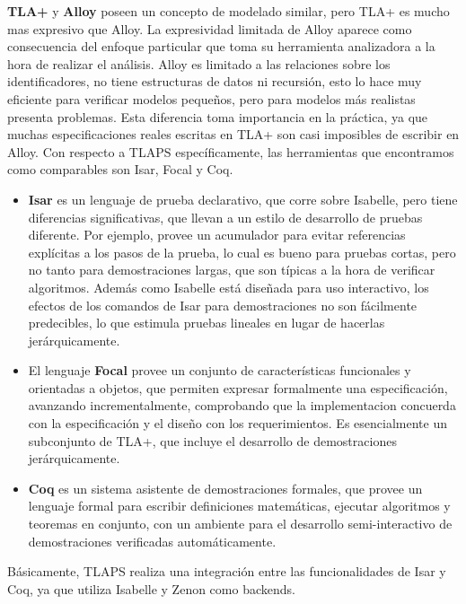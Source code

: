 \documentclass[spanish]{llncs}
\begin{document}
\textbf{TLA+} y \textbf{Alloy} poseen un concepto de modelado similar, pero TLA+ es mucho mas expresivo que Alloy. La expresividad limitada de Alloy aparece como consecuencia del enfoque particular que toma su herramienta analizadora a la hora de realizar el análisis. Alloy es limitado a las relaciones sobre los identificadores, no tiene estructuras de datos ni recursión, esto lo hace muy eficiente para verificar modelos pequeños, pero para modelos más realistas presenta problemas. 
Esta diferencia toma importancia en la práctica, ya que muchas especificaciones reales escritas en TLA+ son 
casi imposibles de escribir en Alloy.
Con respecto a TLAPS específicamente, las herramientas que encontramos como comparables son Isar, Focal y Coq.
    \begin{itemize}
      \item 
      \textbf{Isar} es un lenguaje de prueba declarativo, que corre sobre Isabelle, pero tiene diferencias significativas, que llevan a un estilo de desarrollo de pruebas diferente. Por ejemplo, provee un acumulador para evitar referencias explícitas a los pasos de la prueba, lo cual es bueno para pruebas cortas, pero no tanto para demostraciones largas, que son típicas a la hora de verificar algoritmos. Además como Isabelle está diseñada para uso interactivo, los efectos de los comandos de Isar para demostraciones no son fácilmente 
      predecibles, lo que estimula pruebas lineales en lugar de hacerlas jerárquicamente. 

      \item
      El lenguaje \textbf{Focal} provee un conjunto de características funcionales y orientadas a objetos, que permiten expresar formalmente una especificación, avanzando incrementalmente, comprobando que la implementacion concuerda con la especificación y el diseño con los requerimientos. Es esencialmente un subconjunto de TLA+, que incluye el desarrollo 
      de demostraciones jerárquicamente.

      \item
      \textbf{Coq} es un sistema asistente de demostraciones formales, que provee un lenguaje formal para escribir definiciones matemáticas, ejecutar algoritmos y teoremas en conjunto, con un ambiente para el desarrollo semi-interactivo de demostraciones verificadas automáticamente.

    \end{itemize}
  
  Básicamente, TLAPS realiza una integración entre las funcionalidades de  Isar y Coq, ya que utiliza Isabelle y Zenon como backends.
\end{document}
